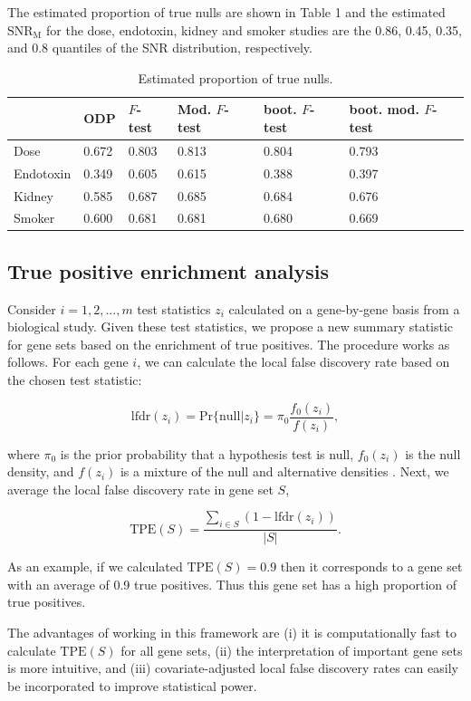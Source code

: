 \documentclass[11pt]{article}
\begin{document}
The estimated proportion of true nulls are shown in Table 1 and the estimated $\text{SNR}_{\text{M}}$ for the dose, endotoxin, kidney and smoker studies are the 0.86, 0.45, 0.35, and 0.8 quantiles of the SNR distribution, respectively. 

\begin{table}
\centering
\begin{tabular}{|l|l|l|l|l|l|}
\hline
          & ODP   & $F$-test & Mod. $F$-test  & boot. $F$-test & boot. mod. $F$-test \\ \hline
Dose      & 0.672 & 0.803 & 0.813 & 0.804         & 0.793         \\ \hline
Endotoxin & 0.349 & 0.605 & 0.615 & 0.388         & 0.397          \\ \hline
Kidney    & 0.585 & 0.687 & 0.685 & 0.684         & 0.676          \\ \hline
Smoker    & 0.600 & 0.681 & 0.681 & 0.680         & 0.669          \\ \hline
\end{tabular}
\caption{Estimated proportion of true nulls.}
\label{tab:pi0}
\end{table}

\subsection{True positive enrichment analysis\label{Subsec:tpea}}

Consider $i=1,2,...,m$ test statistics $z_{i}$ calculated on a gene-by-gene basis from a biological study. Given these test statistics, we propose a new summary statistic for gene sets based on the enrichment of true positives. The procedure works as follows. For each gene $i$, we can calculate the local false discovery rate based on the chosen test statistic:

$$
\text{lfdr}(z_{i}) = \text{Pr}\{\text{null}|z_{i}\} = \pi_{0} \dfrac{f_{0}(z_{i})}{f(z_{i})},
$$

\noindent where $\pi_{0}$ is the prior probability that a hypothesis test is null, $f_{0}(z_{i})$ is the null density, and $f(z_{i})$ is a mixture of the null and alternative densities \citep{efron2001empirical}. Next, we average the local false discovery rate in gene set $S$, 

$$
\text{TPE}(S) = \frac{\sum\limits_{i\in S} (1-\text{lfdr}(z_{i}))}{|S|}.
$$

\noindent As an example, if we calculated $\text{TPE}(S)=0.9$ then it corresponds to a gene set with an average of 0.9 true positives. Thus this gene set has a high proportion of true positives.

The advantages of working in this framework are (i) it is computationally fast to calculate $\text{TPE}(S)$ for all gene sets, (ii) the interpretation of important gene sets is more intuitive, and (iii) covariate-adjusted local false discovery rates can easily be incorporated to improve statistical power.

\clearpage


\end{document}
